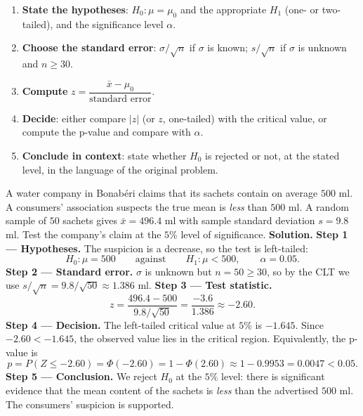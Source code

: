 \documentclass[11pt]{article}
\begin{document}
\begin{methode}
\begin{enumerate}
\item \textbf{State the hypotheses}: $H_0 : \mu = \mu_0$ and the appropriate $H_1$ (one- or two-tailed), and the significance level $\alpha$.
\item \textbf{Choose the standard error}: $\sigma/\sqrt{n}$ if $\sigma$ is known; $s/\sqrt{n}$ if $\sigma$ is unknown and $n \geq 30$.
\item \textbf{Compute} $z = \dfrac{\bar{x} - \mu_0}{\text{standard error}}$.
\item \textbf{Decide}: either compare $|z|$ (or $z$, one-tailed) with the critical value, or compute the p-value and compare with $\alpha$.
\item \textbf{Conclude in context}: state whether $H_0$ is rejected or not, at the stated level, in the language of the original problem.
\end{enumerate}
\end{methode}

\begin{exoresolu}
A water company in Bonabéri claims that its sachets contain on average $500$ ml. A consumers' association suspects the true mean is \emph{less} than $500$ ml. A random sample of $50$ sachets gives $\bar{x} = 496.4$ ml with sample standard deviation $s = 9.8$ ml. Test the company's claim at the $5\%$ level of significance.
\tcblower
\textbf{Solution.}
\textbf{Step 1 — Hypotheses.} The suspicion is a decrease, so the test is left-tailed:
\[ H_0 : \mu = 500 \qquad \text{against} \qquad H_1 : \mu < 500, \qquad \alpha = 0.05. \]
\textbf{Step 2 — Standard error.} $\sigma$ is unknown but $n = 50 \geq 30$, so by the CLT we use $s/\sqrt{n} = 9.8/\sqrt{50} \approx 1.386$ ml.
\textbf{Step 3 — Test statistic.}
\[ z = \frac{496.4 - 500}{9.8/\sqrt{50}} = \frac{-3.6}{1.386} \approx -2.60. \]
\textbf{Step 4 — Decision.} The left-tailed critical value at $5\%$ is $-1.645$. Since $-2.60 < -1.645$, the observed value lies in the critical region. Equivalently, the p-value is
\[ p = P(Z \leq -2.60) = \Phi(-2.60) = 1 - \Phi(2.60) \approx 1 - 0.9953 = 0.0047 < 0.05. \]
\textbf{Step 5 — Conclusion.} We reject $H_0$ at the $5\%$ level: there is significant evidence that the mean content of the sachets is \emph{less} than the advertised $500$ ml. The consumers' suspicion is supported.
\end{exoresolu}
\end{document}

